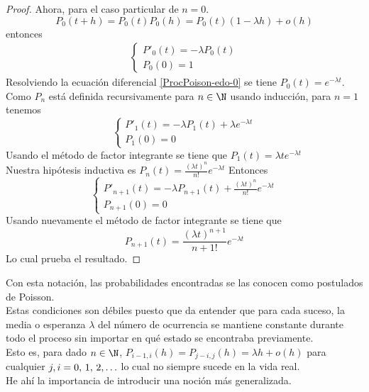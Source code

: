 \begin{proof}
        Ahora, para el caso particular de $n=0$.\\
        $$P_0(t+h)=P_0(t)P_0(h)=P_0(t)(1-\lambda h)+o(h)$$
        entonces
        \begin{eqnarray}
            \begin{cases}
                P'_0(t)=-\lambda P_0(t)\\
                P_0(0)=1
            \end{cases}
             \label{ProcPoison-edo-0}
        \end{eqnarray}
        Resolviendo la ecuación diferencial \ref{ProcPoison-edo-0} se tiene $P_0(t)=e^{-\lambda t}$.\\
        Como $P_n$ está definida recursivamente para $n\in\N$ usando inducción,
        para $n=1$ tenemos 
        $$\begin{cases}
            P'_1(t)=-\lambda P_1(t)+\lambda e^{-\lambda t}\\
            P_1(0)=0
        \end{cases}$$
        Usando el método de factor integrante se tiene que $P_1(t)=\lambda te^{-\lambda t}$
        \\Nuestra hipótesis inductiva es 
        $P_n(t)=\frac{(\lambda t)^n}{n!}e^{-\lambda t}$
        Entonces 
        $$\begin{cases}
            P'_{n+1}(t)=-\lambda P_{n+1}(t)+\frac{(\lambda t)^n}{n!}e^{-\lambda t}\\
            P_{n+1}(0)=0
        \end{cases}$$
        Usando nuevamente el método de factor integrante se tiene que
        $$P_{n+1}(t)=\frac{(\lambda t)^{n+1}}{n+1!}e^{-\lambda t}$$
        Lo cual prueba el resultado.
    \end{proof}
    Con esta notación, las probabilidades encontradas se las conocen como postulados de Poisson.\\
    Estas condiciones son débiles puesto que da entender que para cada suceso, la media o esperanza $\lambda$ del número de ocurrencia se mantiene constante durante todo el proceso sin importar en qué estado se encontraba previamente.\\
    Esto es, para dado $n\in\N$,  $P_{i-1,i}(h)=P_{j-i,j}(h)=\lambda h + o(h)$ para cualquier $j,i=0,\thinspace 1,\thinspace 2 ,\ldots$ lo cual no siempre sucede en la vida real.
    \\He ahí la importancia de introducir una noción más generalizada.